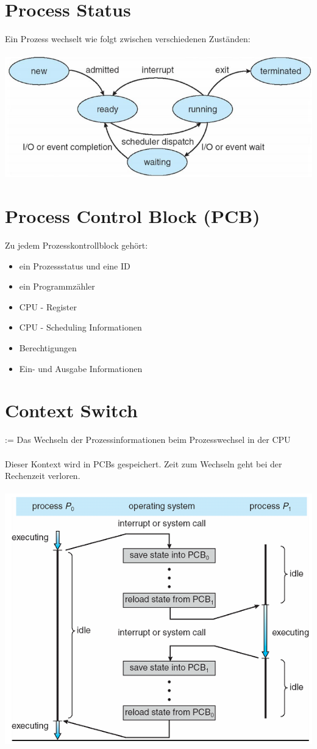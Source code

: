 \documentclass[a4paper]{scrreprt}
\begin{document}
\section{Process Status}
	Ein Prozess wechselt wie folgt zwischen verschiedenen Zuständen:\\ \\
	\includegraphics[scale = 0.6]{graphics/prozess_status.png}
\section{Process Control Block (PCB)}
	Zu jedem Prozesskontrollblock gehört:
	\begin{itemize}
		\item ein Prozessstatus und eine ID
		\item ein Programmzähler
		\item CPU - Register
		\item CPU - Scheduling Informationen
		\item Berechtigungen
		\item Ein- und Ausgabe Informationen
	\end{itemize}
\section{Context Switch}
	:= Das Wechseln der Prozessinformationen beim Prozesswechsel in der CPU\\ \\
	Dieser Kontext wird in PCBs gespeichert. Zeit zum Wechseln geht bei der Rechenzeit verloren.\\ \\
	\includegraphics[scale = 0.6]{graphics/process_switch.png}\\
\end{document}
